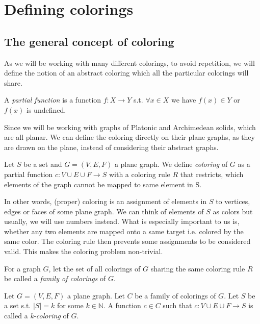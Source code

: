 \chapter{Defining colorings}

\section{The general concept of coloring}

As we will be working with many different colorings, to avoid repetition, we will define the notion of an abstract coloring which all the particular colorings will share.

\begin{defn}
    A \emph{partial function} is a function $f:X \rightarrow Y$ s.t. $\forall x \in X$ we have $f(x) \in Y$ or $f(x)$ is undefined.
\end{defn}

Since we will be working with graphs of Platonic and Archimedean solids, which are all planar. We can define the coloring directly on their plane graphs, as they are drawn on the plane, instead of considering their abstract graphs.

\begin{defn}[coloring]
    Let $S$ be a set and $G=(V,E,F)$ a plane graph. We define \emph{coloring} of $G$ as a partial function $c: V \cup E \cup F \rightarrow S$ with a coloring rule $R$ that restricts, which elements of the graph cannot be mapped to same element in S.
\end{defn}

In other words, (proper) coloring is an assignment of elements in $S$ to vertices, edges or faces of some plane graph. We can think of elements of $S$ as colors but usually, we will use numbers instead. What is especially important to us is, whether any two elements are mapped onto a same target i.e. colored by the same color. The coloring rule then prevents some assignments to be considered valid. This makes the coloring problem non-trivial.

\begin{defn}
    For a graph $G$, let the set of all colorings of $G$ sharing the same coloring rule $R$ be called a \emph{family of colorings} of $G$.
\end{defn}

\begin{defn}[k-coloring]
    Let $G=(V,E,F)$ a plane graph. Let $C$ be a family of colorings of $G$. Let $S$ be a set s.t. $|S| = k$ for some $k \in \mathbb{N}$. A function $c \in C$ such that $c: V \cup E \cup F \rightarrow S$ is called a \emph{k-coloring} of $G$.
\end{defn}

